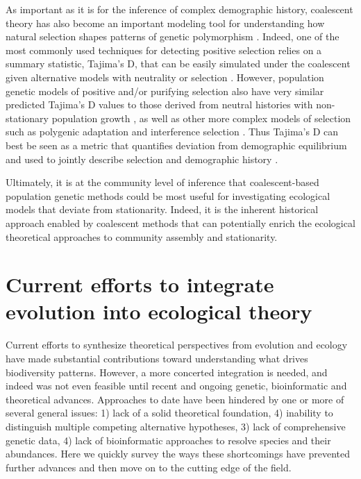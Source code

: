 \documentclass[12pt]{article}
\begin{document}
As important as it is for the inference of complex demographic
history, coalescent theory has also become an important modeling tool
for understanding how natural selection shapes patterns of genetic
polymorphism \citep{Kim2002-ex, Kern2016-ap, Ewing2016-bm}. Indeed,
one of the most commonly used techniques for detecting positive
selection relies on a summary statistic, Tajima's D, that can be
easily simulated under the coalescent given alternative models with
neutrality or selection \citep{Tajima1989-mc}. However, population
genetic models of positive and/or purifying selection also have very
similar predicted Tajima's D values to those derived from neutral
histories with non-stationary population growth
\citep{Freedman2016-yx, Barton1998-xs, Barton2000-gr, Jensen2005-ef,
  Schrider2016-cw}, as well as other more complex models of selection
such as polygenic adaptation and interference selection
\citep{Stephan2016-lf, Good2014-fq}. Thus Tajima's D can best be seen
as a metric that quantifies deviation from demographic equilibrium and
used to jointly describe selection and demographic history
\citep{Kern2016-ap, Ewing2016-bm, Phung2016-uo, Roux2016-hz}.

Ultimately, it is at the community level of inference that
coalescent-based population genetic methods could be most useful for
investigating ecological models that deviate from
stationarity. Indeed, it is the inherent historical approach enabled
by coalescent methods that can potentially enrich the ecological
theoretical approaches to community assembly and stationarity.


\section{Current efforts to integrate evolution into ecological theory} \label{sec:toDate}

Current efforts to synthesize theoretical perspectives from evolution
and ecology have made substantial contributions toward understanding
what drives biodiversity patterns. However, a more concerted
integration is needed, and indeed was not even feasible until recent
and ongoing genetic, bioinformatic and theoretical
advances. Approaches to date have been hindered by one or more of
several general issues: 1) lack of a solid theoretical foundation, 4)
inability to distinguish multiple competing alternative hypotheses, 3)
lack of comprehensive genetic data, 4) lack of bioinformatic
approaches to resolve species and their abundances. Here we quickly
survey the ways these shortcomings have prevented further advances and
then move on to the cutting edge of the field.
\end{document}
